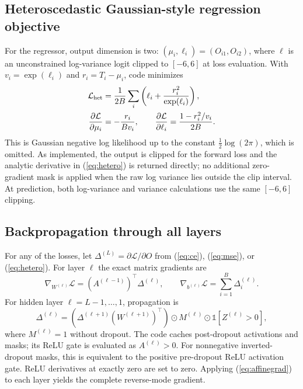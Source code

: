 \documentclass[conference]{IEEEtran}
\begin{document}
\subsection{Heteroscedastic Gaussian-style regression objective}
For the  regressor, output dimension is two: $(\mu_i,\ell_i)=(O_{i1},O_{i2})$, where $\ell$ is an unconstrained log-variance logit clipped to $[-6,6]$ at loss evaluation. With $v_i=\exp(\ell_i)$ and $r_i=T_i-\mu_i$, code minimizes
\begin{align}
 \mathcal L_{\rm het}&=\frac{1}{2B}\sum_i\left(\ell_i+\frac{r_i^2}{\exp(\ell_i)}\right),\\
 \frac{\partial\mathcal L}{\partial\mu_i}&=-\frac{r_i}{Bv_i},\qquad
 \frac{\partial\mathcal L}{\partial\ell_i}=\frac{1-r_i^2/v_i}{2B}.
 \label{eq:hetero}
\end{align}
This is Gaussian negative log likelihood up to the constant $\frac12\log(2\pi)$, which is omitted. As implemented, the output is clipped for the forward loss and the analytic derivative in (\ref{eq:hetero}) is returned directly; no additional zero-gradient mask is applied when the raw log variance lies outside the clip interval. At prediction, both log-variance and variance calculations use the same $[-6,6]$ clipping.

\subsection{Backpropagation through all layers}
For any of the losses, let $\Delta^{(L)}=\partial\mathcal L/\partial O$ from (\ref{eq:ce}), (\ref{eq:mse}), or (\ref{eq:hetero}). For layer $\ell$ the exact matrix gradients are
\begin{equation}
 \nabla_{W^{(\ell)}}\mathcal L=(A^{(\ell-1)})^\top\Delta^{(\ell)},\qquad
 \nabla_{b^{(\ell)}}\mathcal L=\sum_{i=1}^{B}\Delta_i^{(\ell)}.
 \label{eq:affinegrad}
\end{equation}
For hidden layer $\ell=L-1,\ldots,1$, propagation is
\begin{equation}
 \Delta^{(\ell)}=\left(\Delta^{(\ell+1)}(W^{(\ell+1)})^\top\right)\odot M^{(\ell)}\odot\mathbb1[Z^{(\ell)}>0],
 \label{eq:backprop}
\end{equation}
where $M^{(\ell)}=1$ without dropout. The code caches post-dropout activations and masks; its ReLU gate is evaluated as $A^{(\ell)}>0$. For nonnegative inverted-dropout masks, this is equivalent to the positive pre-dropout ReLU activation gate. ReLU derivatives at exactly zero are set to zero. Applying (\ref{eq:affinegrad}) to each layer yields the complete reverse-mode gradient.
\end{document}
